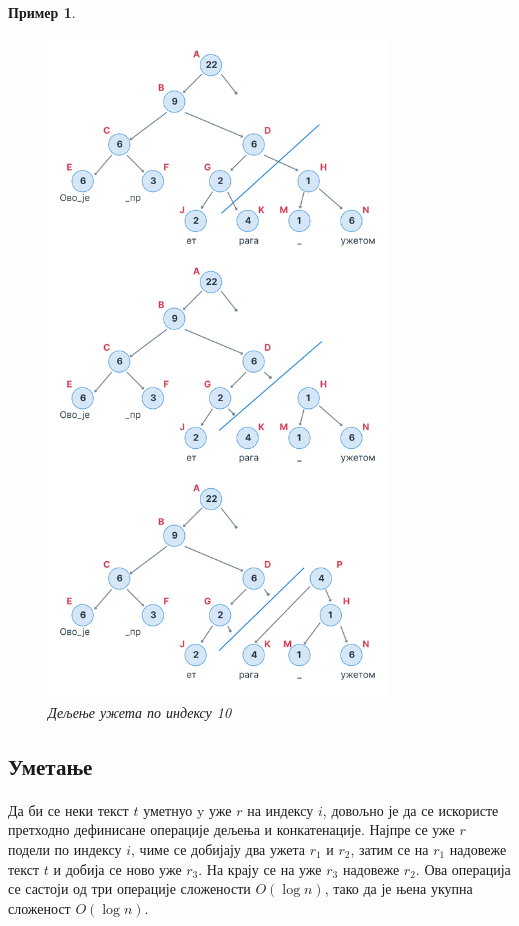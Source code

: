 \documentclass[12pt,oneside]{memoir}
\newtheorem{exmp}{Пример}
\begin{document}
\begin{exmp}
\begin{figure}
  \centering
  \includegraphics[width=0.8\textwidth]{images/rope_split_1.png}
  \caption{Дељење ужета по индексу 10}
  \label{fig:ropе_split}
\end{figure} 
\end{exmp}

\subsection{Уметање}
\paragraph{}
Да би се неки текст \(t\) уметнуо y уже \(r\) на индексу \(i\), довољно је да се искористе претходно дефинисане операције дељења и конкатенације. Најпре се уже \(r\)
подели по индексу \(i\), чиме се добијају два ужета \(r_1\) и \(r_2\), затим се на \(r_1\)
надовеже текст \(t\) и добија се ново уже \(r_3\). На крају се на уже \(r_3\) надовеже \(r_2\). Ова операција се састоји од три операције сложености \(O(\log{}n)\), тако да је
њена укупна сложеност \(O(\log{}n)\).
\end{document}
